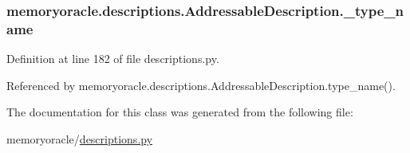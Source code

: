\subsubsection[{\+\_\+type\+\_\+name}]{\setlength{\rightskip}{0pt plus 5cm}memoryoracle.\+descriptions.\+Addressable\+Description.\+\_\+type\+\_\+name\hspace{0.3cm}{\ttfamily [private]}}\label{classmemoryoracle_1_1descriptions_1_1AddressableDescription_a0c63647032d370f7d04976f4651098df}


Definition at line 182 of file descriptions.\+py.



Referenced by memoryoracle.\+descriptions.\+Addressable\+Description.\+type\+\_\+name().



The documentation for this class was generated from the following file\+:\begin{DoxyCompactItemize}
\item 
memoryoracle/\hyperlink{descriptions_8py}{descriptions.\+py}\end{DoxyCompactItemize}
